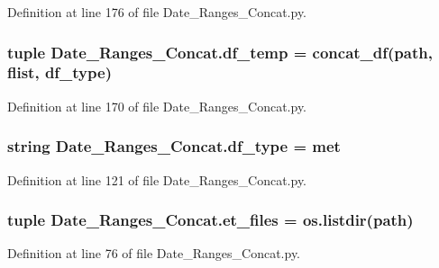 Definition at line 176 of file Date\+\_\+\+Ranges\+\_\+\+Concat.\+py.

\hypertarget{namespace_date___ranges___concat_a039c0a41a1dc09c14f8b72186850d0a4}{}
\subsubsection[{df\+\_\+temp}]{\setlength{\rightskip}{0pt plus 5cm}tuple Date\+\_\+\+Ranges\+\_\+\+Concat.\+df\+\_\+temp = {\bf concat\+\_\+df}({\bf path}, {\bf flist}, {\bf df\+\_\+type})}\label{namespace_date___ranges___concat_a039c0a41a1dc09c14f8b72186850d0a4}


Definition at line 170 of file Date\+\_\+\+Ranges\+\_\+\+Concat.\+py.

\hypertarget{namespace_date___ranges___concat_a34d743f3f351e0c5fdce2c21586a234d}{}
\subsubsection[{df\+\_\+type}]{\setlength{\rightskip}{0pt plus 5cm}string Date\+\_\+\+Ranges\+\_\+\+Concat.\+df\+\_\+type = \textquotesingle{}met\textquotesingle{}}\label{namespace_date___ranges___concat_a34d743f3f351e0c5fdce2c21586a234d}


Definition at line 121 of file Date\+\_\+\+Ranges\+\_\+\+Concat.\+py.

\hypertarget{namespace_date___ranges___concat_ad0a440f18491626dabb985b4571b9a96}{}
\subsubsection[{et\+\_\+files}]{\setlength{\rightskip}{0pt plus 5cm}tuple Date\+\_\+\+Ranges\+\_\+\+Concat.\+et\+\_\+files = os.\+listdir({\bf path})}\label{namespace_date___ranges___concat_ad0a440f18491626dabb985b4571b9a96}


Definition at line 76 of file Date\+\_\+\+Ranges\+\_\+\+Concat.\+py.

